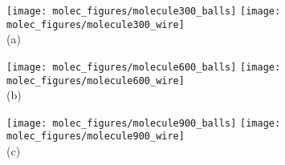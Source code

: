 \documentclass[]{article}
\begin{document}
\centering

\centering
\texttt{[image: molec\_figures/molecule300\_balls]}
    \texttt{[image: molec\_figures/molecule300\_wire]}\\
    (a)

\centering
  \texttt{[image: molec\_figures/molecule600\_balls]}
    \texttt{[image: molec\_figures/molecule600\_wire]}\\
    
(b)

\centering
  \texttt{[image: molec\_figures/molecule900\_balls]}
    \texttt{[image: molec\_figures/molecule900\_wire]}\\
(c)
\end{document}
